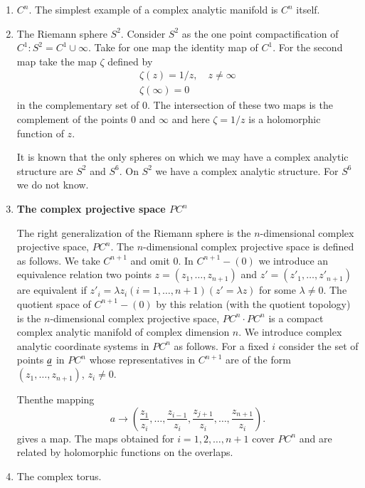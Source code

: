 \begin{enumerate}
\renewcommand{\theenumi}{\roman{enumi}}
\renewcommand{\labelenumi}{\theenumi)}
\item $C^{n}$. The simplest example of a complex analytic manifold is
  $C^{n}$ itself.

\item The Riemann sphere $S^{2}$. Consider $S^{2}$ as the one point
  compactification of $C^{1}:S^{2}=C^{1}\cup \infty$. Take for one map
  the identity map of $C^{1}$. For the second map take the map $\zeta$
  defined by 
\begin{gather*}
\zeta(z)=1/z,\quad z\neq \infty\\
\zeta(\infty)=0
\end{gather*}\pageoriginale
in the complementary set of $0$. The intersection of these two maps
is the complement of the points $0$ and $\infty$ and here $\zeta=1/z$
is a holomorphic function of $z$.

It is known that the only spheres on which we may have a complex
analytic structure are $S^{2}$ and $S^{6}$. On $S^{2}$ we have a
complex analytic structure. For $S^{6}$ we do not know.

\item {\bf The complex projective space $PC^{n}$}

The right generalization of the Riemann sphere is the $n$-dimen\-sional
complex projective space, $PC^{n}$. The $n$-dimensional complex
projective space is defined as follows. We take $C^{n+1}$ and omit
$0$. In $C^{n+1}-(0)$ we introduce an equivalence relation two points
$z=(z_{1},\ldots,z_{n+1})$ and $z'=(z'_{1},\ldots,z'_{n+1})$ are
equivalent if $z'_{i}=\lambda z_{i}(i=1,\ldots,n+1)(z'=\lambda z)$ for
some $\lambda\neq 0$. The quotient space of $C^{n+1}-(0)$ by this
relation (with the quotient topology) is the $n$-dimensional complex
projective space, $PC^{n}\cdot PC^{n}$ is a compact complex analytic
manifold of complex dimension $n$. We introduce complex analytic
coordinate systems in $PC^{n}$ as follows. For a fixed $i$ consider
the set of points $\underline{a}$ in $PC^{n}$ whose representatives in
$C^{n+1}$ are of the form $(z_{1},\ldots,z_{n+1})$, $z_{i}\neq 0$.


Then\pageoriginale the mapping
$$
a\to
\left(\frac{z_{1}}{z_{i}},\ldots,\frac{z_{i-1}}{z_{i}},\frac{z_{j+1}}{z_{i}},\ldots,\frac{z_{n+1}}{z_{i}}\right).  
$$
gives a map. The maps obtained for $i=1,2,\ldots,n+1$ cover $PC^{n}$
and are related by holomorphic functions on the overlaps.

\item The complex torus.

\end{enumerate}
